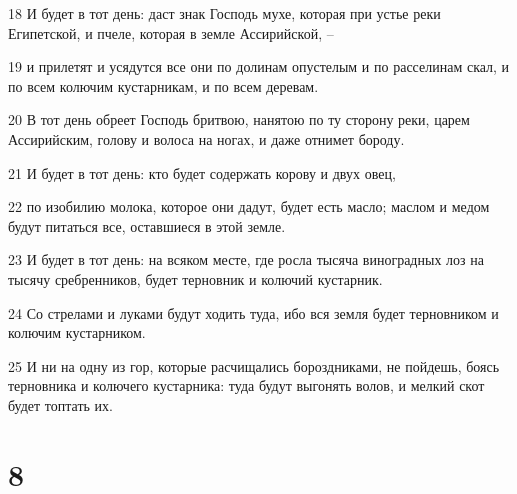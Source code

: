 \par 18 И будет в тот день: даст знак Господь мухе, которая при устье реки Египетской, и пчеле, которая в земле Ассирийской, --
\par 19 и прилетят и усядутся все они по долинам опустелым и по расселинам скал, и по всем колючим кустарникам, и по всем деревам.
\par 20 В тот день обреет Господь бритвою, нанятою по ту сторону реки, царем Ассирийским, голову и волоса на ногах, и даже отнимет бороду.
\par 21 И будет в тот день: кто будет содержать корову и двух овец,
\par 22 по изобилию молока, которое они дадут, будет есть масло; маслом и медом будут питаться все, оставшиеся в этой земле.
\par 23 И будет в тот день: на всяком месте, где росла тысяча виноградных лоз на тысячу сребренников, будет терновник и колючий кустарник.
\par 24 Со стрелами и луками будут ходить туда, ибо вся земля будет терновником и колючим кустарником.
\par 25 И ни на одну из гор, которые расчищались бороздниками, не пойдешь, боясь терновника и колючего кустарника: туда будут выгонять волов, и мелкий скот будет топтать их.

\chapter{8}


